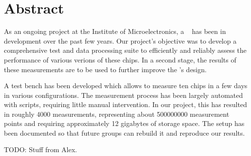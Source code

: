 \chapter*{Abstract}
\label{ch:abstract}

As an ongoing  project at the Institute of Microelectronics,  a \sdm~ has been
in development over the past few years. Our project's objective was to develop
a comprehensive  test and  data processing suite  to efficiently  and reliably
assess the performance  of various verions of these chips. In  a second stage,
the results of these measurements are to be used to further improve the \sdm's
design.

A  test  bench  has been  developed  which  allows  to  measure ten  chips  in
a  few  days  in  various configurations. The  measurement  process  has  been
largely automated  with scripts, requiring little  manual intervention. In our
project, this  has resulted  in roughly \num{4000}  measurements, representing
about \num{500000000} measurement points  and requiring approximately \num{12}
gigabytes  of storage  space. The setup  has  been documented  so that  future
groups can rebuild it and reproduce our results.

TODO: Stuff from Alex.

